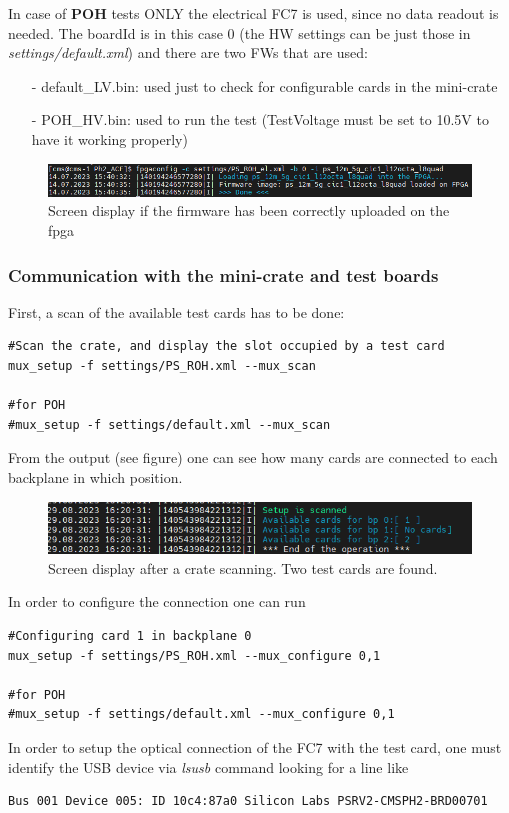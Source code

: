 \documentclass[10pt,a4paper]{article}
\begin{document}
In case of {\bf POH} tests ONLY the electrical FC7 is used, since no data readout is needed. The boardId is in this case 0 (the HW settings can be just those in {\it settings/default.xml}) and there are two FWs that are used:
\begin{itemize}
\item[-] default\_LV.bin: used just to check for configurable cards in the mini-crate
\item[-] POH\_HV.bin: used to run the test (TestVoltage must be set to 10.5V to have it working properly)
\end{itemize}
 

\begin{figure}[h!]
\centering
 \includegraphics[width=\linewidth]{firmware-writing.png} 
  \caption{Screen display if the firmware has been correctly uploaded on the fpga}
\end{figure}

\subsubsection{Communication with the mini-crate and test boards}
First, a scan of the available test cards has to be done:
\begin{framed}
\begin{verbatim}
#Scan the crate, and display the slot occupied by a test card
mux_setup -f settings/PS_ROH.xml --mux_scan

#for POH
#mux_setup -f settings/default.xml --mux_scan 
\end{verbatim}
\end{framed}
From the output (see figure) one can see how many cards are connected to each backplane in which position.
\begin{figure}[h!]
\centering
 \includegraphics[width=\linewidth]{mux_scan.png} 
  \caption{Screen display after a crate scanning. Two test cards are found.}
\end{figure}
In order to configure the connection one can run 
\begin{framed}
\begin{verbatim}
#Configuring card 1 in backplane 0
mux_setup -f settings/PS_ROH.xml --mux_configure 0,1

#for POH
#mux_setup -f settings/default.xml --mux_configure 0,1
\end{verbatim}
\end{framed}
In order to setup the optical connection of the FC7 with the test card, one must identify the USB device via {\it lsusb} command looking for a line like
\begin{framed}
\begin{verbatim}
Bus 001 Device 005: ID 10c4:87a0 Silicon Labs PSRV2-CMSPH2-BRD00701 
\end{verbatim}
\end{framed}
\end{document}
